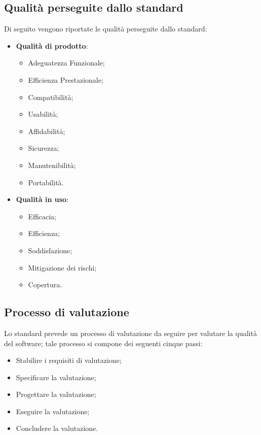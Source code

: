 \subsection{Qualità perseguite dallo standard}
Di seguito vengono riportate le qualità perseguite dallo standard:
\begin{itemize}
	\item \textbf{Qualità di prodotto}:
		\begin{itemize}
			\item Adeguatezza Funzionale;
			\item Efficienza Prestazionale;
			\item Compatibilità;
			\item Usabilità;
			\item Affidabilità;
			\item Sicurezza;
			\item Manutenibilità;
			\item Portabilità.
		\end{itemize}
	\item \textbf{Qualità in uso}:
		\begin{itemize}
			\item Efficacia;
			\item Efficienza;
			\item Soddisfazione;
			\item Mitigazione dei rischi;
			\item Copertura.
		\end{itemize}
\end{itemize}

\subsection{Processo di valutazione}
Lo standard prevede un processo di valutazione da seguire per valutare la qualità del software; tale processo si compone dei seguenti cinque passi:
\begin{itemize}
	\item Stabilire i requisiti di valutazione;
	\item Specificare la valutazione;
	\item Progettare la valutazione;
	\item Eseguire la valutazione;
	\item Concludere la valutazione.
\end{itemize}
